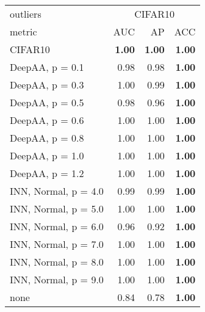 \begin{tabular}{lrrr}
\toprule
{outliers} & \multicolumn{3}{c}{CIFAR10} \\
{metric} & {AUC} & {AP} & {ACC} \\
\midrule
CIFAR10 & \bfseries 1.00 & \bfseries 1.00 & \bfseries 1.00 \\
DeepAA, p = 0.1 & 0.98 & 0.98 & \bfseries 1.00 \\
DeepAA, p = 0.3 & 1.00 & 0.99 & \bfseries 1.00 \\
DeepAA, p = 0.5 & 0.98 & 0.96 & \bfseries 1.00 \\
DeepAA, p = 0.6 & 1.00 & 1.00 & \bfseries 1.00 \\
DeepAA, p = 0.8 & 1.00 & 1.00 & \bfseries 1.00 \\
DeepAA, p = 1.0 & 1.00 & 1.00 & \bfseries 1.00 \\
DeepAA, p = 1.2 & 1.00 & 1.00 & \bfseries 1.00 \\
INN, Normal, p = 4.0 & 0.99 & 0.99 & \bfseries 1.00 \\
INN, Normal, p = 5.0 & 1.00 & 1.00 & \bfseries 1.00 \\
INN, Normal, p = 6.0 & 0.96 & 0.92 & \bfseries 1.00 \\
INN, Normal, p = 7.0 & 1.00 & 1.00 & \bfseries 1.00 \\
INN, Normal, p = 8.0 & 1.00 & 1.00 & \bfseries 1.00 \\
INN, Normal, p = 9.0 & 1.00 & 1.00 & \bfseries 1.00 \\
none & 0.84 & 0.78 & \bfseries 1.00 \\
\bottomrule
\end{tabular}
